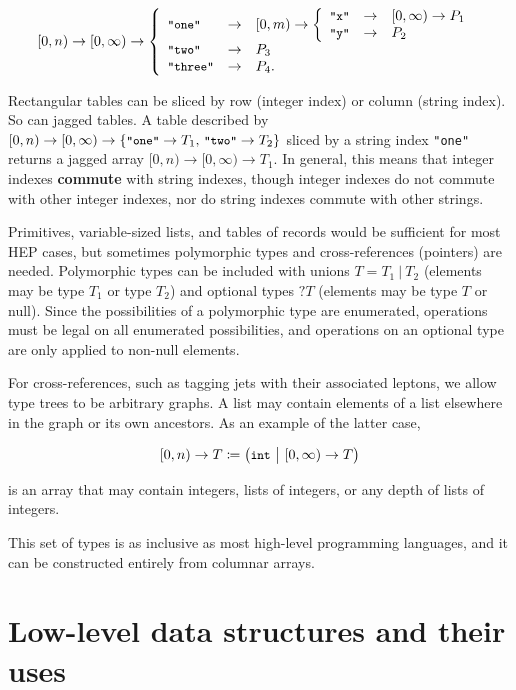 \documentclass{webofc}
\begin{document}
\vspace{-\baselineskip}
\[ [0, n) \to [0, \infty) \to \left\{\begin{array}{l c l}
\mbox{\small\tt "one"} & \to & [0, m) \to \left \{\begin{array}{l c l} \mbox{\small\tt "x"} & \to & [0, \infty) \to P_1 \\ \mbox{\small\tt "y"} & \to & P_2 \end{array}\right. \\
\mbox{\small\tt "two"} & \to & P_3 \\
\mbox{\small\tt "three"} & \to & P_4\mbox{.} \end{array}\right. \]

Rectangular tables can be sliced by row (integer index) or column (string index). So can jagged tables. A table described by $[0, n) \to [0, \infty) \to \{\mbox{\small\tt "one"} \to T_1\mbox{, }\mbox{\small\tt "two"} \to T_2\}$ sliced by a string index {\small\tt "one"} returns a jagged array $[0, n) \to [0, \infty) \to T_1$. In general, this means that integer indexes {\bf commute} with string indexes, though integer indexes do not commute with other integer indexes, nor do string indexes commute with other strings.

Primitives, variable-sized lists, and tables of records would be sufficient for most HEP cases, but sometimes polymorphic types and cross-references (pointers) are needed. Polymorphic types can be included with unions $T = T_1\ |\ T_2$ (elements may be type $T_1$ or type $T_2$) and optional types $?T$ (elements may be type $T$ or null). Since the possibilities of a polymorphic type are enumerated, operations must be legal on all enumerated possibilities, and operations on an optional type are only applied to non-null elements.

For cross-references, such as tagging jets with their associated leptons, we allow type trees to be arbitrary graphs. A list may contain elements of a list elsewhere in the graph or its own ancestors. As an example of the latter case,

\[ [0, n) \to T \coloneqq \big( \mbox{\small\tt int}\ \big|\ [0, \infty) \to T \big) \]

\noindent is an array that may contain integers, lists of integers, or any depth of lists of integers.

This set of types is as inclusive as most high-level programming languages, and it can be constructed entirely from columnar arrays.

\section{Low-level data structures and their uses}
\end{document}
